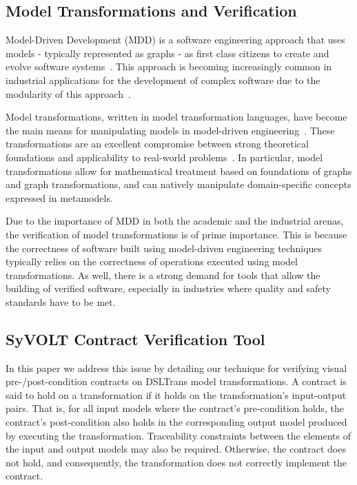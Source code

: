 \subsection{Model Transformations and Verification}

Model-Driven Development (MDD) is a software engineering approach that uses models - typically represented as graphs - as first class citizens to create and evolve software systems~\cite{Hailpern:2006vd}. This approach is becoming increasingly common in industrial applications for the development of complex software due to the modularity of this approach~\cite{daghsen:hal-00660252,Giese2010}.


Model transformations, written in model transformation languages, have become the main means
for manipulating models in model-driven engineering~\cite{Brambilla12}. These transformations are an excellent compromise between strong theoretical foundations and applicability to real-world problems~\cite{LucioSoSyM2015}. In particular, model transformations allow for mathematical treatment based on foundations of graphs and graph transformations, and can natively
manipulate domain-specific concepts expressed in metamodels.




Due to the importance of MDD in both the academic and the industrial arenas,
the verification of model transformations is of prime importance. This is because
the correctness of software built using model-driven engineering techniques
typically relies on the correctness of operations executed using model
transformations. As well, there is a strong demand for tools that allow the building of verified
software, especially in industries where quality and safety standards have to be met.


\subsection{SyVOLT Contract Verification Tool}

In this paper we address this issue by detailing our technique for verifying visual pre-/post-condition contracts on DSLTrans model transformations. A contract is said to hold on a transformation if it holds on the transformation's input-output pairs. That is, for all input models where the contract's pre-condition
holds, the contract's post-condition also holds in the corresponding output model produced by executing the transformation. Traceability constraints between the elements of the input and output models may also be required. Otherwise, the contract does not hold, and consequently, the transformation does not correctly implement the contract.

